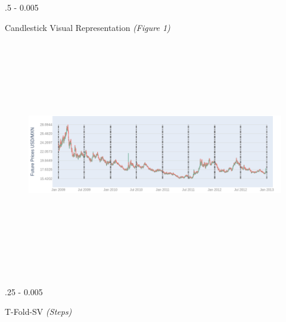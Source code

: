 \documentclass{postertheme}\usepackage[]{graphicx}\usepackage[]{color}
\begin{document}
\begin{frame}
\begin{columns}[onlytextwidth]
\begin{column}{.5 \textwidth - 0.005 \textwidth}
\begin{block}{Candlestick Visual Representation \footnotesize \textit{(Figure 1)}}
\begin{minipage}[h]{0.25 \textwidth}
    \end{minipage}
    \begin{minipage}[h]{0.75 \textwidth}
      \centering
        \begin{figure}
          \hfill \includegraphics[width=28cm, height=10cm,keepaspectratio=true]{figures/plot-ohlcprices.png}
        \end{figure}
    \end{minipage}
    \end{block}
  \end{column}

\end{columns}


\begin{columns}[onlytextwidth]
  
  \begin{column}{.25 \textwidth - 0.005 \textwidth}
    \begin{block}{T-Fold-SV \footnotesize \textit{(Steps)}} \footnotesize
        

\end{block}
\end{column}
\end{columns}
\end{frame}
\end{document}
